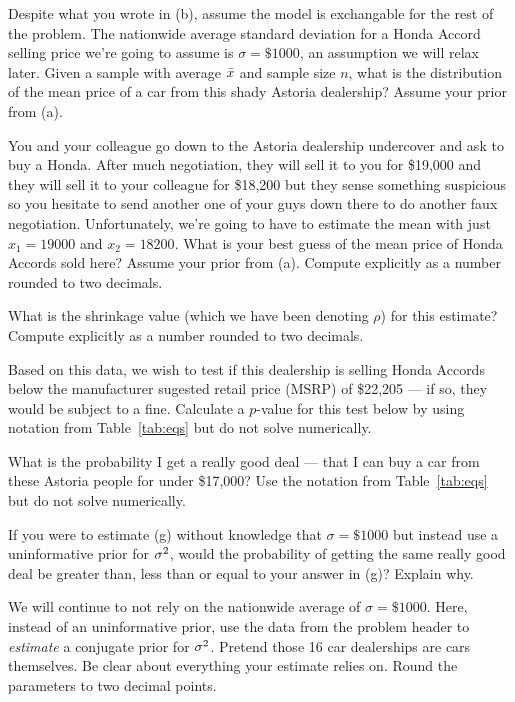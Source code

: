 \documentclass[12pt]{article}
\newcommand{\compexpl}{Compute explicitly as a number rounded to two decimals.}
\begin{document}
 Despite what you wrote in (b), assume the model is exchangable for the rest of the problem. The nationwide average standard deviation for a Honda Accord selling price we're going to assume is $\sigma = \$1000$, an assumption we will relax later. Given a sample with average $\bar{x}$ and sample size $n$, what is the distribution of the mean price of a car from this shady Astoria dealership? Assume your prior from (a).

 You and your colleague go down to the Astoria dealership undercover and ask to buy a Honda. After much negotiation, they will sell it to you for \$19,000 and they will sell it to your colleague for \$18,200 but they sense something suspicious so you hesitate to send another one of your guys down there to do another faux negotiation. Unfortunately, we're going to have to estimate the mean with just $x_1=19000$ and $x_2 = 18200$. What is your best guess of the mean price of Honda Accords sold here? Assume your prior from (a). \compexpl {}

 What is the shrinkage value (which we have been denoting $\rho$) for this estimate? \compexpl{}

 Based on this data, we wish to test if this dealership is selling Honda Accords below the manufacturer sugested retail price (MSRP) of \$22,205 --- if so, they would be subject to a fine. Calculate a $p$-value for this test below by using notation from Table~\ref{tab:eqs} but do not solve numerically.

 What is the probability I get a really good deal --- that I can buy a car from these Astoria people for under \$17,000? Use the notation from Table~\ref{tab:eqs} but do not solve numerically.


 If you were to estimate (g) without knowledge that $\sigma = \$1000$ but instead use a uninformative prior for $\sigma^2$, would the probability of getting the same really good deal be greater than, less than or equal to your answer in (g)? Explain why. 


 We will continue to not rely on the nationwide average of $\sigma = \$1000$. Here, instead of an uninformative prior, use the data from the problem header to \textit{estimate} a conjugate prior for $\sigma^2$. Pretend those 16 car dealerships are cars themselves. Be clear about everything your estimate relies on. Round the parameters to two decimal points.
\end{document}
